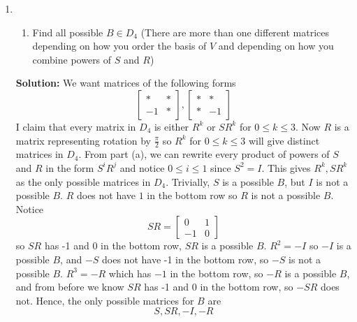 \documentclass[letterpaper,12pt]{article}
\theoremstyle{definition}
\begin{document}
   \begin{enumerate} 
   \item[] \begin{enumerate} 
   \item[] Find all possible $B \in D_4$ (There are more than one different matrices depending on how you order the basis of $V$ and depending on how you combine powers of $S$ and $R$)
\end{enumerate}
\begin{mdframed}
    \textbf{Solution:}
    We want matrices of the following forms $$\begin{bmatrix}
        * & * \\ -1 & *
    \end{bmatrix}, \begin{bmatrix}
        * & * \\ * & -1
    \end{bmatrix}$$ I claim that every matrix in $D_4$ is either $R^k$ or $SR^k$ for $0\leq k \leq 3$. Now $R$ is a matrix representing rotation by $\frac{\pi}{2}$ so $R^k$ for $0\leq k \leq 3$ will give distinct matrices in $D_4$. From part (a), we can rewrite every product of powers of $S$ and $R$ in the form $S^iR^j$ and notice $0 \leq i \leq 1$ since $S^2 = I$. This gives $R^k,SR^k$ as the only possible matrices in $D_4$.  Trivially, $S$ is a possible $B$, but $I$ is not a possible $B$. $R$ does not have $1$ in the bottom row so $R$ is not a possible $B$. Notice
    $$SR = \begin{bmatrix}
      0  & 1\\-1 &0
    \end{bmatrix}$$ so $SR$ has -1 and 0 in the bottom row, $SR$ is a possible $B$. $R^2 = -I$ so $-I$ is a possible $B$, and $-S$ does not have -1 in the bottom row, so $-S$ is not a possible $B$. $R^3 = -R$ which has $-1$ in the bottom row, so $-R$ is a possible $B$, and from before we know $SR$ has -1 and 0 in the bottom row, so $-SR$ does not. Hence, the only possible matrices for $B$ are 
    $$S,SR,-I,-R$$
\end{mdframed}
\end{enumerate}
\pagebreak
\end{document}
